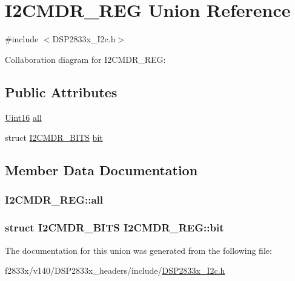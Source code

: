 \hypertarget{union_i2_c_m_d_r___r_e_g}{}\section{I2\+C\+M\+D\+R\+\_\+\+R\+E\+G Union Reference}
\label{union_i2_c_m_d_r___r_e_g}


{\ttfamily \#include $<$D\+S\+P2833x\+\_\+\+I2c.\+h$>$}



Collaboration diagram for I2\+C\+M\+D\+R\+\_\+\+R\+E\+G\+:
\subsection*{Public Attributes}
\begin{DoxyCompactItemize}
\item 
\hyperlink{_d_s_p2833x___device_8h_a59a9f6be4562c327cbfb4f7e8e18f08b}{Uint16} \hyperlink{union_i2_c_m_d_r___r_e_g_a37dda719f5bdf5409dd15e0ae06240f5}{all}
\item 
struct \hyperlink{struct_i2_c_m_d_r___b_i_t_s}{I2\+C\+M\+D\+R\+\_\+\+B\+I\+T\+S} \hyperlink{union_i2_c_m_d_r___r_e_g_a4f5ada5ab9c47169996959944095f621}{bit}
\end{DoxyCompactItemize}


\subsection{Member Data Documentation}
\hypertarget{union_i2_c_m_d_r___r_e_g_a37dda719f5bdf5409dd15e0ae06240f5}{}
\subsubsection[{all}]{ I2\+C\+M\+D\+R\+\_\+\+R\+E\+G\+::all}\label{union_i2_c_m_d_r___r_e_g_a37dda719f5bdf5409dd15e0ae06240f5}
\hypertarget{union_i2_c_m_d_r___r_e_g_a4f5ada5ab9c47169996959944095f621}{}
\subsubsection[{bit}]{\setlength{\rightskip}{0pt plus 5cm}struct {\bf I2\+C\+M\+D\+R\+\_\+\+B\+I\+T\+S} I2\+C\+M\+D\+R\+\_\+\+R\+E\+G\+::bit}\label{union_i2_c_m_d_r___r_e_g_a4f5ada5ab9c47169996959944095f621}


The documentation for this union was generated from the following file\+:\begin{DoxyCompactItemize}
\item 
f2833x/v140/\+D\+S\+P2833x\+\_\+headers/include/\hyperlink{_d_s_p2833x___i2c_8h}{D\+S\+P2833x\+\_\+\+I2c.\+h}\end{DoxyCompactItemize}
